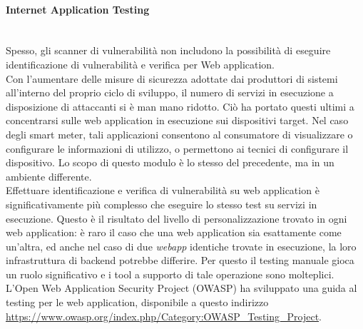 \paragraph{Internet Application Testing}\mbox{}\\
Spesso, gli scanner di vulnerabilità non includono la possibilità di eseguire identificazione di vulnerabilità e verifica per Web application.\\
Con l'aumentare delle misure di sicurezza adottate dai produttori di sistemi all'interno del proprio ciclo di sviluppo, il numero di servizi in esecuzione a disposizione di attaccanti si è man mano ridotto. Ciò ha portato questi ultimi a concentrarsi sulle web application in esecuzione sui dispositivi target. Nel caso degli smart meter, tali applicazioni consentono al consumatore di visualizzare o configurare le informazioni di utilizzo, o permettono ai tecnici di configurare il dispositivo. Lo scopo di questo modulo è lo stesso del precedente, ma in un ambiente differente.\\
Effettuare identificazione e verifica di vulnerabilità su web application è significativamente più complesso che eseguire lo stesso test su servizi in esecuzione. Questo è il risultato del livello di personalizzazione trovato in ogni web application: è raro il caso che una web application sia esattamente come un'altra, ed anche nel caso di due \emph{webapp} identiche trovate in esecuzione, la loro infrastruttura di backend potrebbe differire. Per questo il testing manuale gioca un ruolo significativo e i tool a supporto di tale operazione sono molteplici. L'Open Web Application Security Project (OWASP) ha sviluppato una guida al testing per le web application, disponibile a questo indirizzo \url{https://www.owasp.org/index.php/Category:OWASP_Testing_Project}.

